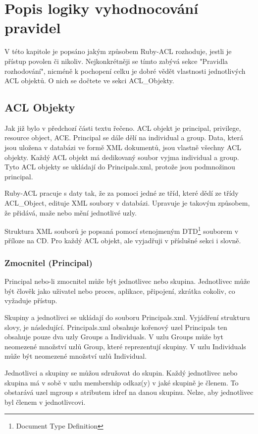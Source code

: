 \section{Popis logiky vyhodnocování pravidel}
V této kapitole je popsáno jakým způsobem Ruby-ACL rozhoduje, jestli je přístup povolen či nikoliv. Nejkonkrétněji se tímto zabývá sekce "Pravidla rozhodování", nicméně k pochopení celku je dobré vědět vlastnosti jednotlivých ACL objektů. O nich se dočtete ve sekci ACL\_Objekty.

\subsection{ACL Objekty}
Jak již bylo v předchozí části textu řečeno. ACL objekt je principal, privilege, resource object, ACE. Principal se dále dělí na individual a group. Data, která jsou uložena v databázi ve formě XML dokumentů, jsou vlastně všechny ACL objekty. Každý ACL objekt má dedikovaný soubor vyjma individual a group. Tyto ACL objekty se ukládají do Principals.xml, protože jsou podmnožinou principal.

Ruby-ACL pracuje s daty tak, že za pomoci jedné ze tříd, které dědí ze třídy ACL\_Object, edituje XML soubory v databázi. Upravuje je takovým způsobem, že přidává, maže nebo mění jednotlivé uzly.

Struktura XML souborů je popsaná pomocí stenojmeným DTD\footnote[1]{Document Type Definition} souborem v příloze na CD. Pro každý ACL objekt, ale vyjadřuji v příslušné sekci i slovně.

\subsubsection {Zmocnitel (Principal)}
Principal nebo-li zmocnitel může být jednotlivec nebo skupina. Jednotlivec může být člověk jako uživatel nebo proces, aplikace, připojení, zkrátka cokoliv, co vyžaduje přístup.

Skupiny a jednotlivci se ukládají do souboru Principals.xml.
Vyjádření strukturu slovy, je následující. Principals.xml obsahuje kořenový uzel Principals ten obsahuje pouze dva uzly Groups a Individuals. V uzlu Groups může byt neomezené množství uzlů Group, které reprezentují skupiny. V uzlu Individuals může být neomezené množství uzlů Individual. 

Jednotlivci a skupiny se můžou sdružovat do skupin. Každý jednotlivec nebo skupina má v sobě v uzlu membership odkaz(y) v jaké skupině je členem. To obstarává uzel mgroup s atributem idref na danou skupinu. Nelze, aby jednotlivec byl členem v jednotlivcovi.

